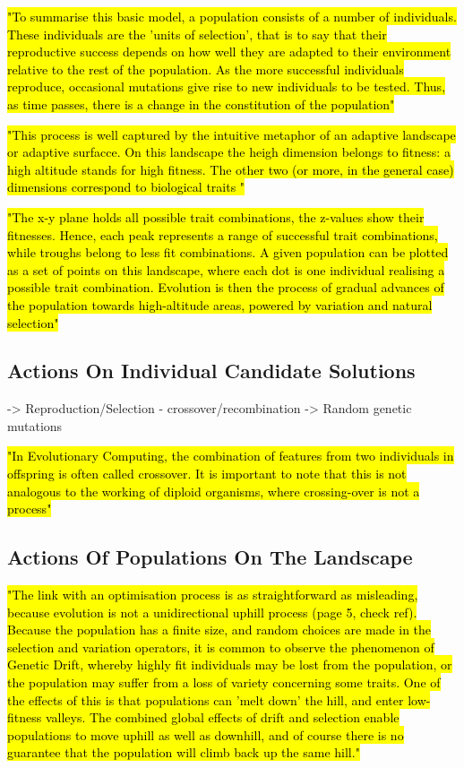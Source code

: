 \hl{"To summarise this basic model, a population consists of a number of individuals. These individuals are the 'units of selection', that is to say that their reproductive success depends on how well they are adapted to their environment relative to the rest of the population. As the more successful individuals reproduce, occasional mutations give rise to new individuals to be tested. Thus, as time passes, there is a change in the constitution of the population"} \cite{EibenSmith2003}

\hl{"This process is well captured by the intuitive metaphor of an adaptive landscape or adaptive surfacce. On this landscape the heigh dimension belongs to fitness: a high altitude stands for high fitness. The other two (or more, in the general case) dimensions correspond to biological traits "} \cite{EibenSmith2003}


\hl{"The x-y plane holds all possible trait combinations, the z-values show their fitnesses. Hence, each peak represents a range of successful trait combinations, while troughs belong to less fit combinations. A given population can be plotted as a set of points on this landscape, where each dot is one individual realising a possible trait combination. Evolution is then the process of gradual advances of the population towards high-altitude areas, powered by variation and natural selection"} \cite{EibenSmith2003}

\subsection{Actions On Individual Candidate Solutions}
-> Reproduction/Selection - crossover/recombination
-> Random genetic mutations

\hl{"In Evolutionary Computing, the combination of features from two individuals in offspring is often called crossover. It is important to note that this is not analogous to the working of diploid organisms, where crossing-over is not a process"} \cite{EibenSmith2003}

\subsection{Actions Of Populations On The Landscape}

\hl{"The link with an optimisation process is as straightforward as misleading, because evolution is not a unidirectional uphill process (page 5, check ref). Because the population has a finite size, and random choices are made in the selection and variation operators, it is common to observe the phenomenon of Genetic Drift, whereby highly fit individuals may be lost from the population, or the population may suffer from a loss of variety concerning some traits. One of the effects of this is that populations can 'melt down' the hill, and enter low-fitness valleys. The combined global effects of drift and selection enable populations to move uphill as well as downhill, and of course there is no guarantee that the population will climb back up the same hill."} \cite{EibenSmith2003}

